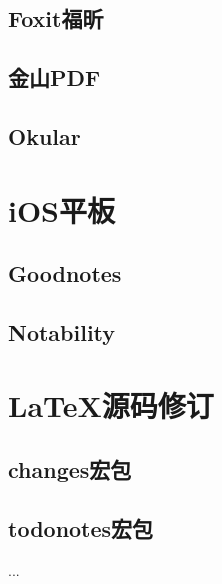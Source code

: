 \documentclass[fontset = none, t, aspectratio=169]{ctexbeamer}
\begin{document}
\subsection{Foxit福昕}
\subsection{金山PDF}
\subsection{Okular}

\section{iOS平板}
\subsection{Goodnotes}
\subsection{Notability}

\section{\LaTeX 源码修订}
\subsection{changes宏包}
\subsection{todonotes宏包}

\begin{frame}
  ...
\end{frame}
\end{document}
